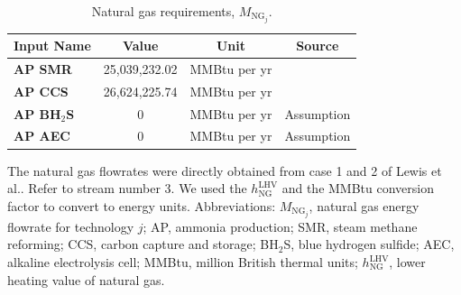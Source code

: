 \documentclass{article}
\begin{document}
\begin{table}[H]
  \centering
  \caption{Natural gas requirements, $M_{\text{NG}_j}$.}
  \label{table:si_technical7_natural_gas_requirements}
  \begin{threeparttable}
    \begin{tabular}{@{}lccc@{}}
      \toprule
      \textbf{Input Name} & \textbf{Value} & \textbf{Unit} & \textbf{Source} \\ \midrule
      \textbf{AP SMR} & 25,039,232.02 & MMBtu per yr & \cite{LEWIS2022} \\
      \textbf{AP CCS} & 26,624,225.74 & MMBtu per yr & \cite{LEWIS2022} \\
      \textbf{AP BH$_2$S} & 0 & MMBtu per yr & Assumption \\
      \textbf{AP AEC} & 0 & MMBtu per yr & Assumption \\ \bottomrule
    \end{tabular}
    \begin{tablenotes}
      \small
      \item The natural gas flowrates were directly obtained from case 1 and 2 of Lewis et al.\cite{LEWIS2022}. Refer to stream number 3. We used the $h_{\text{NG}}^{\text{LHV}}$ and the MMBtu conversion factor to convert to energy units. Abbreviations: $M_{\text{NG}_j}$, natural gas energy flowrate for technology $j$; AP, ammonia production; SMR, steam methane reforming; CCS, carbon capture and storage; BH$_2$S, blue hydrogen sulfide; AEC, alkaline electrolysis cell; MMBtu, million British thermal units; $h_{\text{NG}}^{\text{LHV}}$, lower heating value of natural gas.
    \end{tablenotes}
  \end{threeparttable}
\end{table}
\end{document}
